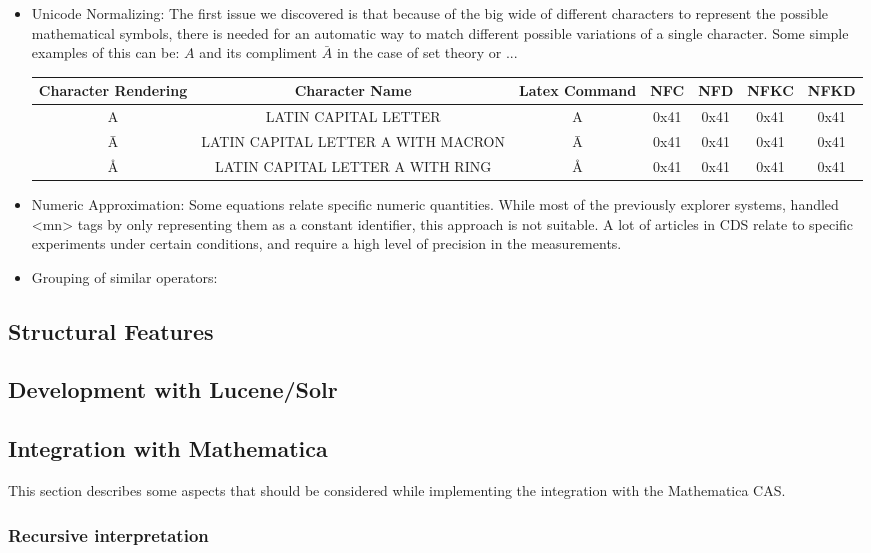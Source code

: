 \begin{itemize}
  \item Unicode Normalizing: The first issue we discovered is that because of the big wide of different characters to represent the possible mathematical symbols, there is needed for an automatic way to match different possible variations of a single character. Some simple examples of this can be: $A$ and its compliment $\bar{A}$ in the case of set theory or ...
\begin{tabular}{|c|c|c|c|c|c|c|}
\hline 
Character Rendering & Character Name & Latex Command & NFC & NFD & NFKC & NFKD \\ 
\hline 
A & LATIN CAPITAL LETTER  & A & 0x41 & 0x41 & 0x41 & 0x41 \\ 
Ā & LATIN CAPITAL LETTER A WITH MACRON  & \={A} & 0x41 & 0x41 & 0x41 & 0x41 \\ 
Å & LATIN CAPITAL LETTER A WITH RING  & \r{A} & 0x41 & 0x41 & 0x41 & 0x41 \\ 


\hline 
\end{tabular} 
  \item Numeric Approximation: Some equations relate specific numeric quantities. While most of the previously explorer systems, handled <mn> tags by only representing them as a constant identifier, this approach is not suitable. A lot of articles in CDS relate to specific experiments under certain conditions, and require a high level of precision in the measurements. 
  \item Grouping of similar operators:
\end{itemize}

\subsection{Structural Features}


\subsection{Development with Lucene/Solr}

\subsection{Integration with Mathematica}
This section describes some aspects that should be considered while implementing the integration with the Mathematica CAS. 

\subsubsection{Recursive interpretation}

